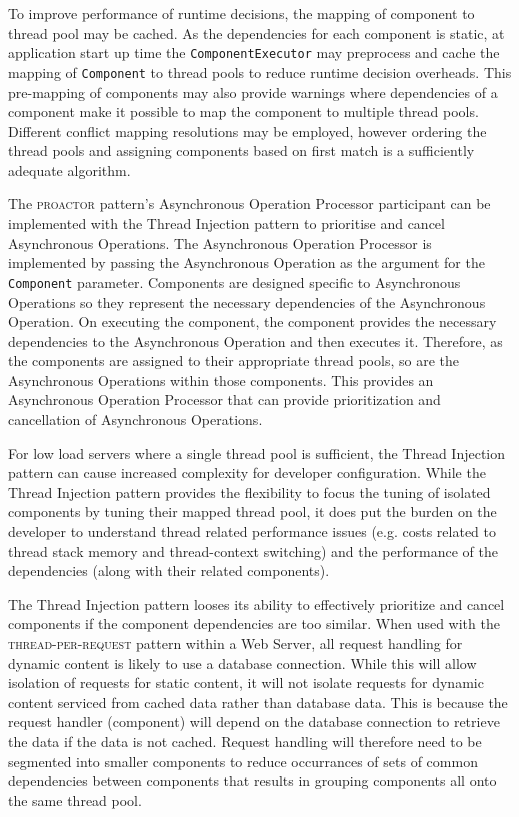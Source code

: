 \documentclass[prodmode]{style/acmlarge}
\begin{document}
To improve performance of runtime decisions, the mapping of component to thread
pool may be cached.  As the dependencies for each component is static, at
application start up time the \texttt{ComponentExecutor} may preprocess and
cache the mapping of \texttt{Component} to thread pools to reduce runtime
decision overheads.  This pre-mapping of components may also provide warnings
where dependencies of a component make it possible to map the component to
multiple thread pools.  Different conflict mapping resolutions may be employed,
however ordering the thread pools and assigning components based on first match
is a sufficiently adequate algorithm.

The \textsc{proactor} pattern's Asynchronous Operation Processor participant can
be implemented with the Thread Injection pattern to prioritise and cancel
Asynchronous Operations.  The Asynchronous Operation Processor is implemented by
passing the Asynchronous Operation as the argument for the \texttt{Component}
parameter.  Components are designed specific to Asynchronous Operations so they
represent the necessary dependencies of the Asynchronous Operation.  On
executing the component, the component provides the necessary dependencies to
the Asynchronous Operation and then executes it.  Therefore, as the components
are assigned to their appropriate thread pools, so are the Asynchronous
Operations within those components.  This provides an Asynchronous Operation
Processor that can provide prioritization and cancellation of Asynchronous
Operations.

For low load servers where a single thread pool is sufficient, the Thread
Injection pattern can cause increased complexity for developer configuration.
While the Thread Injection pattern provides the flexibility to focus the tuning
of isolated components by tuning their mapped thread pool, it does put the
burden on the developer to understand thread related performance issues (e.g.
costs related to thread stack memory and thread-context switching) and the
performance of the dependencies (along with their related components).

The Thread Injection pattern looses its ability to effectively prioritize and
cancel components if the component dependencies are too similar.  When used with
the \textsc{thread-per-request} pattern within a Web Server, all request
handling for dynamic content is likely to use a database connection.  While this
will allow isolation of requests for static content, it will not isolate
requests for dynamic content serviced from cached data rather than database
data.  This is because the request handler (component) will depend on the
database connection to retrieve the data if the data is not cached.  Request
handling will therefore need to be segmented into smaller components to reduce
occurrances of sets of common dependencies between components that results in
grouping components all onto the same thread pool.
\end{document}
